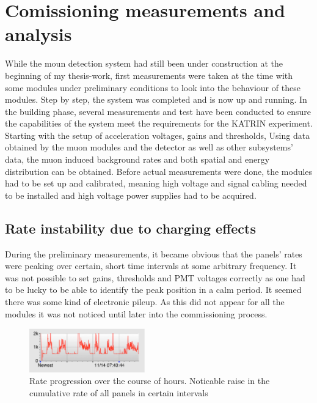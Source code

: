 %

\chapter{Comissioning measurements and analysis}
\label{ch:Analysis}

  While the moun detection system had still been under construction at the beginning of my thesis-work, first measurements were taken at the time with some modules under preliminary conditions to look into the behaviour of these modules. Step by step, the system was completed and is now up and running. In the building phase, several measurements and test have been conducted to ensure the capabilities of the system meet the requirements for the KATRIN experiment. Starting with the setup of acceleration voltages, gains and thresholds, 
  Using data obtained by the muon modules and the detector as well as other subsystems' data, the muon induced background rates and both spatial and energy distribution can be obtained. Before actual measurements were done, the modules had to be set up and calibrated, meaning high voltage and signal cabling needed to be installed and high voltage power supplies had to be acquired.
    \section{Rate instability due to charging effects}
    \label{ch:Analysis:sec:Rate instability due to charging effects}
  During the preliminary measurements, it became obvious that the panels' rates were peaking over certain, short time intervals at some arbitrary frequency. It was not possible to set gains, thresholds and PMT voltages correctly as one had to be lucky to be able to identify the peak position in a calm period. It seemed there was some kind of electronic pileup. As this did not appear for all the modules it was not noticed until later into the commissioning process.
  \begin{figure}
   \centering
   \includegraphics[width=5cm]{graphics/setup/Noise_Rate_Problem_cutout.eps}
   \caption[Muon modules' rate: noise problems]{Rate progression over the course of hours. Noticable raise in the cumulative rate of all panels in certain intervals}
  \end{figure}
  
